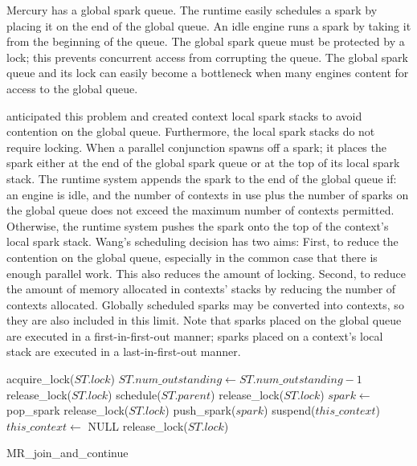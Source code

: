 Mercury has a global spark queue.
The runtime easily schedules a spark by placing it on the end of the
global queue.
An idle engine runs a spark by taking it from the beginning of the queue.
The global spark queue must be protected by a lock;
this prevents concurrent access from corrupting the queue.
The global spark queue and its lock can easily become a bottleneck when many
engines content for access to the global queue.

\citet{wang-hons} anticipated this problem and created context local spark
stacks to avoid contention on the global queue.
Furthermore, the local spark stacks do not require locking.
When a parallel conjunction spawns off a spark; it places the spark either
at the end of the global spark queue or at the top of its local spark stack.
The runtime system appends the spark to the end of the global queue if:
an engine is idle, and
the number of contexts in use plus the number of sparks on the global queue
does not exceed the maximum number of contexts permitted.
Otherwise,
the runtime system pushes the spark onto the top of the context's local
spark stack.
Wang's scheduling decision has two aims:
First, to reduce the contention on the global queue,
especially in the common case that there is enough parallel work.
This also reduces the amount of locking.
Second, to reduce the amount of memory allocated
in contexts' stacks by reducing the number of contexts allocated.
Globally scheduled sparks may be converted into contexts,
so they are also included in this limit.
Note that sparks placed on the global queue are executed in a
first-in-first-out manner;
sparks placed on a context's local stack are executed in a
last-in-first-out manner.

\begin{algorithm}
\begin{algorithmic}
  \State acquire\_lock($ST.lock$)
  \State $ST.num\_outstanding \gets ST.num\_outstanding - 1$
      \State release\_lock($ST.lock$)
    \Else
      \State schedule($ST.parent$)
      \State release\_lock($ST.lock$)
    \EndIf
  \Else
    \State $spark \gets$ pop\_spark
        \State release\_lock($ST.lock$)
      \EndIf
      \State push\_spark($spark$)
    \EndIf
       \State suspend($this\_context$)
       \State $this\_context \gets$ NULL
    \EndIf
    \State release\_lock($ST.lock$)
  \EndIf
\EndProcedure
\end{algorithmic}
\caption{MR\_join\_and\_continue}
\label{alg:join_and_continue_peterw}
\end{algorithm}

